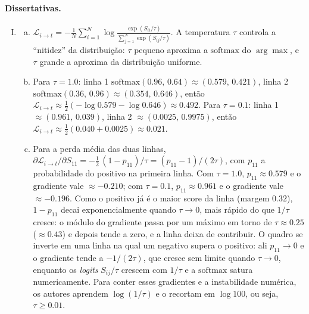 \documentclass{dlproblemset}
\begin{document}
\paragraph{Dissertativas.}
\begin{enumerate}[I)]
    \item
    \begin{enumerate}[(a)]
        \item $\mathcal{L}_{i \to t} = -\tfrac{1}{N}\sum_{i=1}^{N} \log\frac{\exp(S_{ii}/\tau)}{\sum_{j=1}^{N} \exp(S_{ij}/\tau)}$. A temperatura $\tau$ controla a ``nitidez'' da distribuição: $\tau$ pequeno aproxima a $\mathrm{softmax}$ do $\arg\max$, e $\tau$ grande a aproxima da distribuição uniforme.
        \item Para $\tau = 1.0$: linha 1 $\mathrm{softmax}(0.96,\, 0.64) \approx (0.579,\, 0.421)$, linha 2 $\mathrm{softmax}(0.36,\, 0.96) \approx (0.354,\, 0.646)$, então $\mathcal{L}_{i \to t} \approx \tfrac{1}{2}(-\log 0.579 - \log 0.646) \approx 0.492$. Para $\tau = 0.1$: linha 1 $\approx (0.961,\, 0.039)$, linha 2 $\approx (0.0025,\, 0.9975)$, então $\mathcal{L}_{i \to t} \approx \tfrac{1}{2}(0.040 + 0.0025) \approx 0.021$.
        \item Para a perda média das duas linhas, $\partial \mathcal{L}_{i \to t}/\partial S_{11} = -\tfrac{1}{2}\,(1 - p_{11})/\tau = (p_{11} - 1)/(2\tau)$, com $p_{11}$ a probabilidade do positivo na primeira linha. Com $\tau = 1.0$, $p_{11} \approx 0.579$ e o gradiente vale $\approx -0.210$; com $\tau = 0.1$, $p_{11} \approx 0.961$ e o gradiente vale $\approx -0.196$. Como o positivo já é o maior score da linha (margem $0.32$), $1 - p_{11}$ decai exponencialmente quando $\tau \to 0$, mais rápido do que $1/\tau$ cresce: o módulo do gradiente passa por um máximo em torno de $\tau \approx 0.25$ ($\approx 0.43$) e depois tende a zero, e a linha deixa de contribuir. O quadro se inverte em uma linha na qual um negativo supera o positivo: ali $p_{11} \to 0$ e o gradiente tende a $-1/(2\tau)$, que cresce sem limite quando $\tau \to 0$, enquanto os \textit{logits} $S_{ij}/\tau$ crescem com $1/\tau$ e a $\mathrm{softmax}$ satura numericamente. Para conter esses gradientes e a instabilidade numérica, os autores aprendem $\log(1/\tau)$ e o recortam em $\log 100$, ou seja, $\tau \geq 0.01$.
    \end{enumerate}


\end{enumerate}
\end{document}
